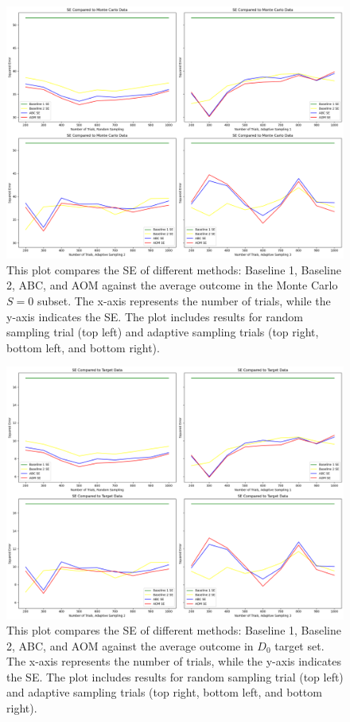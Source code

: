 \documentclass[12pt, oneside]{amsart}
\theoremstyle{definition}
\theoremstyle{remark}
\numberwithin{equation}{section}
\begin{document}
\begin{figure}[hbt!]
    \centering
    \includegraphics[scale=0.15]{Report/Figure/se_mc.jpg}
    \caption{This plot compares the SE of different methods: Baseline 1, Baseline 2, ABC, and AOM against the average outcome in the Monte Carlo $S=0$ subset. The x-axis represents the number of trials, while the y-axis indicates the SE. The plot includes results for random sampling trial (top left) and adaptive sampling trials (top right, bottom left, and bottom right).}
    \label{se_mc}
\end{figure}
\FloatBarrier

\begin{figure}[hbt!]
    \centering
    \includegraphics[scale=0.15]{Report/Figure/se_target.jpg}
    \caption{This plot compares the SE of different methods: Baseline 1, Baseline 2, ABC, and AOM against the average outcome in $D_0$ target set. The x-axis represents the number of trials, while the y-axis indicates the SE. The plot includes results for random sampling trial (top left) and adaptive sampling trials (top right, bottom left, and bottom right).}
    \label{se_target}
\end{figure}
\FloatBarrier
\end{document}
